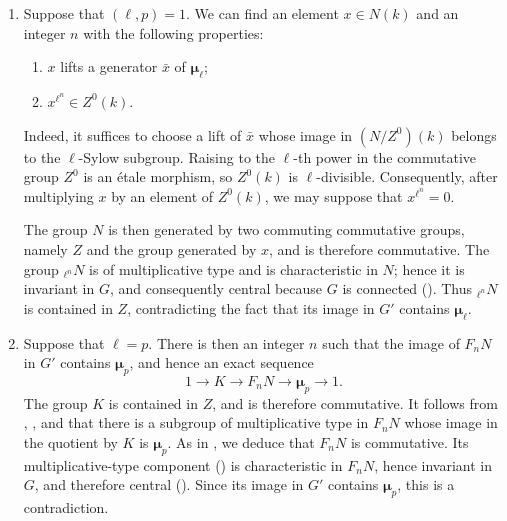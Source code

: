 \begin{enumerate}
\item[(i)] 
  Suppose that \((\ell,p)=1\).  We can find an element
  \(x\in N(k)\) and an integer \(n\) with the following
  properties:
  \begin{enumerate}
  \item[(a)] 
    \(x\) lifts a generator \(\bar x\) of
    \(\boldsymbol\mu_\ell\);
  \item[(b)] 
    \(x^{\ell^n}\in Z^0(k)\).
  \end{enumerate}
  Indeed, it suffices to choose a lift of \(\bar x\) whose image
  in \((N/Z^0)(k)\) belongs to the \(\ell\)-Sylow subgroup.
  Raising to the \(\ell\)-th power in the commutative group
  \(Z^0\) is an étale morphism, so \(Z^0(k)\) is
  \(\ell\)-divisible.  Consequently, after multiplying \(x\) by
  an element of \(Z^0(k)\), we may suppose that
  \(x^{\ell^n}=0\).


  The group \(N\) is then generated by two commuting commutative
  groups, namely \(Z\) and the group generated by \(x\), and is
  therefore commutative.  The group \({}_{\ell^n}N\) is of
  multiplicative type and is characteristic in \(N\); hence it is
  invariant in \(G\), and consequently central because \(G\) is
  connected ().  Thus \({}_{\ell^n}N\) is contained
  in \(Z\), contradicting the fact that its image in \(G'\)
  contains \(\boldsymbol\mu_\ell\).

\item[(ii)] 
  Suppose that \(\ell=p\).  There is then an integer \(n\) such
  that the image of \(F_nN\) in \(G'\) contains
  \(\boldsymbol\mu_p\), and hence an exact sequence
  \[
    1\longrightarrow K\longrightarrow F_nN
      \longrightarrow\boldsymbol\mu_p\longrightarrow1. \tag{*}\label{sga3:xvii:lemma:7-3-2:equation:star}
  \]
  The group \(K\) is contained in \(Z\), and is therefore
  commutative.  It follows from , , and  that
  there is a subgroup of multiplicative type in \(F_nN\) whose
  image in the quotient by \(K\) is \(\boldsymbol\mu_p\).  As in
  , we deduce that \(F_nN\) is commutative.  Its
  multiplicative-type component () is characteristic in
  \(F_nN\), hence invariant in \(G\), and therefore central
  ().  Since its image in \(G'\) contains
  \(\boldsymbol\mu_p\), this is a contradiction.
\end{enumerate}

